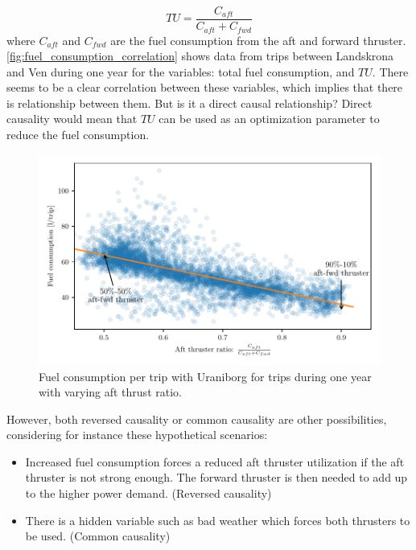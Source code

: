 \documentclass[fleqn,10pt]{olplainarticle}
\begin{document}
\begin{equation}
    TU = \frac{C_{aft}}{C_{aft} + C_{fwd}}
    \label{eq:aft_thrust_ratio}
\end{equation}
where $C_{aft}$ and $C_{fwd}$ are the fuel consumption from the aft and forward thruster.
\autoref{fig:fuel_consumption_correlation} shows data from trips between Landskrona and Ven during one year for the variables: total fuel consumption, and $TU$. There seems to be a clear correlation between these variables,  which implies that there is relationship between them. But is it a direct causal relationship? Direct causality would mean that $TU$ can be used as an optimization parameter to reduce the fuel consumption.
\begin{figure}[!htb]
    \centering
    \includegraphics[width=\textwidth]{figures/correlation.pdf}
    \caption{Fuel consumption per trip with Uraniborg for trips during one year with varying aft thrust ratio.}
    \label{fig:fuel_consumption_correlation}
\end{figure}
However, both reversed causality or common causality are other possibilities, considering for instance these hypothetical scenarios:
\begin{itemize}
    \item Increased fuel consumption forces a reduced aft thruster utilization if the aft thruster is not strong enough. The forward thruster is then needed to add up to the higher power demand. (Reversed causality)

    \item There is a hidden variable such as bad weather which forces both thrusters to be used. (Common causality)
\end{itemize}
\end{document}
